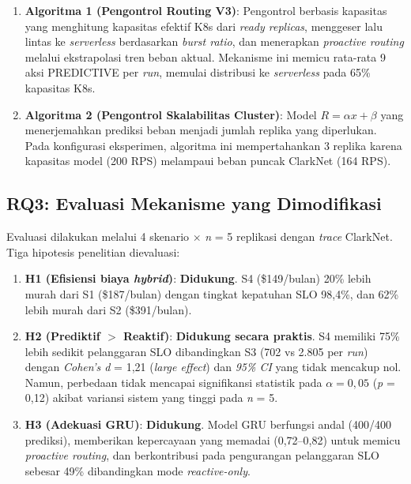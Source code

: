 \begin{enumerate}
    \item \textbf{Algoritma 1 (Pengontrol Routing V3)}: Pengontrol berbasis kapasitas yang menghitung kapasitas efektif K8s dari \emph{ready replicas}, menggeser lalu lintas ke \emph{serverless} berdasarkan \emph{burst ratio}, dan menerapkan \emph{proactive routing} melalui ekstrapolasi tren beban aktual. Mekanisme ini memicu rata-rata 9 aksi PREDICTIVE per \emph{run}, memulai distribusi ke \emph{serverless} pada 65\% kapasitas K8s.

    \item \textbf{Algoritma 2 (Pengontrol Skalabilitas Cluster)}: Model $R = \alpha x + \beta$ yang menerjemahkan prediksi beban menjadi jumlah replika yang diperlukan. Pada konfigurasi eksperimen, algoritma ini mempertahankan 3 replika karena kapasitas model (200 RPS) melampaui beban puncak ClarkNet (164 RPS).
\end{enumerate}

\subsection{RQ3: Evaluasi Mekanisme yang Dimodifikasi}

Evaluasi dilakukan melalui 4 skenario $\times$ \emph{n} = 5 replikasi dengan \emph{trace} ClarkNet. Tiga hipotesis penelitian dievaluasi:

\begin{enumerate}
    \item \textbf{H1 (Efisiensi biaya \emph{hybrid})}: \textbf{Didukung}. S4 (\$149/bulan) 20\% lebih murah dari S1 (\$187/bulan) dengan tingkat kepatuhan SLO 98,4\%, dan 62\% lebih murah dari S2 (\$391/bulan).

    \item \textbf{H2 (Prediktif $>$ Reaktif)}: \textbf{Didukung secara praktis}. S4 memiliki 75\% lebih sedikit pelanggaran SLO dibandingkan S3 (702 vs 2.805 per \emph{run}) dengan \emph{Cohen's d} = 1,21 (\emph{large effect}) dan \emph{95\% CI} yang tidak mencakup nol. Namun, perbedaan tidak mencapai signifikansi statistik pada $\alpha = 0,05$ (\emph{p} = 0,12) akibat variansi sistem yang tinggi pada \emph{n} = 5.

    \item \textbf{H3 (Adekuasi GRU)}: \textbf{Didukung}. Model GRU berfungsi andal (400/400 prediksi), memberikan kepercayaan yang memadai (0,72--0,82) untuk memicu \emph{proactive routing}, dan berkontribusi pada pengurangan pelanggaran SLO sebesar 49\% dibandingkan mode \emph{reactive-only}.
\end{enumerate}


